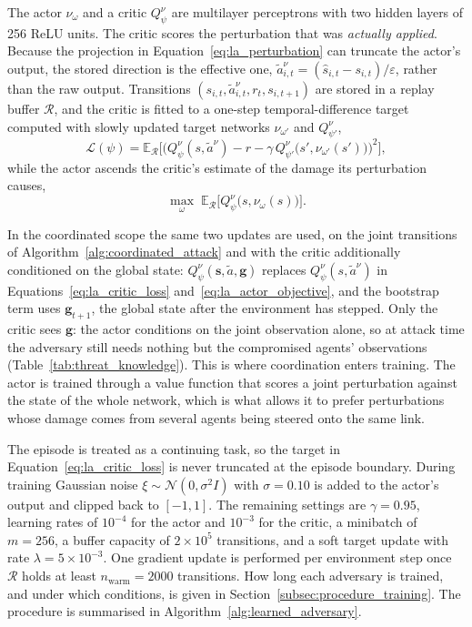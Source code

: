 The actor $\nu_\omega$ and a critic $Q^{\nu}_{\psi}$ are multilayer perceptrons with
two hidden layers of 256 ReLU units. The critic scores the perturbation that was
\emph{actually applied}. Because the projection in
Equation~\eqref{eq:la_perturbation} can truncate the actor's output, the stored
direction is the effective one,
$\tilde{a}^{\nu}_{i,t} = (\hat{s}_{i,t} - s_{i,t})/\varepsilon$, rather than the raw
output. Transitions $(s_{i,t}, \tilde{a}^{\nu}_{i,t}, r_t, s_{i,t+1})$ are stored in a
replay buffer $\mathcal{R}$, and the critic is fitted to a one-step temporal-difference
target computed with slowly updated target networks $\nu_{\omega'}$ and
$Q^{\nu}_{\psi'}$,
\begin{equation}
  \mathcal{L}(\psi) = \mathbb{E}_{\mathcal{R}}\Big[
    \big( Q^{\nu}_{\psi}(s, \tilde{a}^{\nu})
      - r - \gamma\, Q^{\nu}_{\psi'}\big(s', \nu_{\omega'}(s')\big) \big)^2 \Big],
  \label{eq:la_critic_loss}
\end{equation}
while the actor ascends the critic's estimate of the damage its perturbation causes,
\begin{equation}
  \max_{\omega} \; \mathbb{E}_{\mathcal{R}}\Big[ Q^{\nu}_{\psi}\big(s, \nu_\omega(s)\big) \Big].
  \label{eq:la_actor_objective}
\end{equation}

In the coordinated scope the same two updates are used, on the joint transitions of
Algorithm~\ref{alg:coordinated_attack} and with the critic additionally conditioned on
the global state: $Q^{\nu}_{\psi}(\mathbf{s}, \tilde{a}, \mathbf{g})$ replaces
$Q^{\nu}_{\psi}(s, \tilde{a}^{\nu})$ in Equations~\eqref{eq:la_critic_loss}
and~\eqref{eq:la_actor_objective}, and the bootstrap term uses
$\mathbf{g}_{t+1}$, the global state after the environment has stepped. Only the critic
sees $\mathbf{g}$: the actor conditions on the joint observation alone, so at attack time
the adversary still needs nothing but the compromised agents' observations
(Table~\ref{tab:threat_knowledge}). This is where coordination enters training. The actor
is trained through a value function that scores a joint perturbation against the state of
the whole network, which is what allows it to prefer perturbations whose damage comes
from several agents being steered onto the same link.

The episode is treated as a continuing task, so the target in
Equation~\eqref{eq:la_critic_loss} is never truncated at the episode boundary. During
training Gaussian noise $\xi \sim \mathcal{N}(0, \sigma^2 I)$ with $\sigma = 0.10$ is
added to the actor's output and clipped back to $[-1,1]$. The remaining settings are
$\gamma = 0.95$, learning rates of $10^{-4}$ for the actor and $10^{-3}$ for the critic,
a minibatch of $m = 256$, a buffer capacity of $2 \times 10^{5}$ transitions, and a
soft target update with rate $\lambda = 5 \times 10^{-3}$. One gradient update is
performed per environment step once $\mathcal{R}$ holds at least
$n_{\text{warm}} = 2000$ transitions. How long each adversary is trained, and under
which conditions, is given in Section~\ref{subsec:procedure_training}. The procedure is
summarised in Algorithm~\ref{alg:learned_adversary}.

